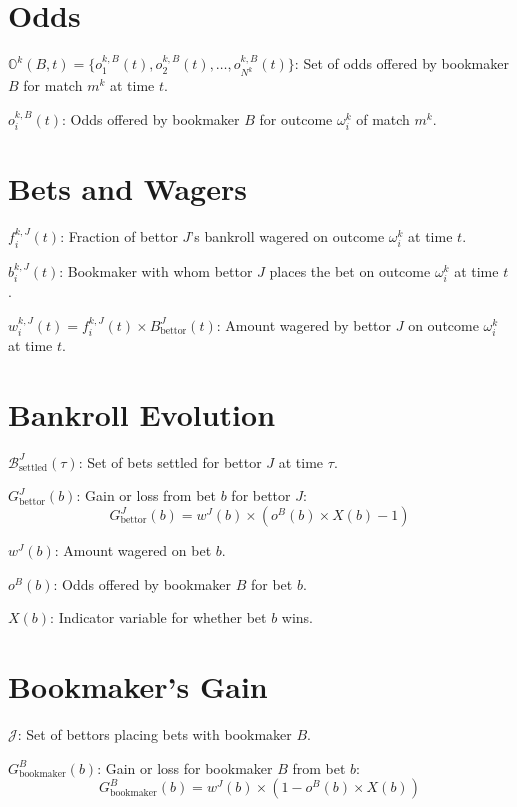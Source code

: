 \section{Odds}

\item \( \mathbb{O}^k(B, t) = \{ o_1^{k,B}(t), o_2^{k,B}(t), \dots, o_{N^k}^{k,B}(t) \} \): Set of odds offered by bookmaker \( B \) for match \( m^k \) at time \( t \).
\item \( o_i^{k,B}(t) \): Odds offered by bookmaker \( B \) for outcome \( \omega_i^k \) of match \( m^k \).

\section{Bets and Wagers}

\item \( f_i^{k,J}(t) \): Fraction of bettor \( J \)'s bankroll wagered on outcome \( \omega_i^k \) at time \( t \).
\item \( b_i^{k,J}(t) \): Bookmaker with whom bettor \( J \) places the bet on outcome \( \omega_i^k \) at time \( t \).
\item \( w_i^{k,J}(t) = f_i^{k,J}(t) \times B_{\text{bettor}}^J(t) \): Amount wagered by bettor \( J \) on outcome \( \omega_i^k \) at time \( t \).

\section{Bankroll Evolution}

\item \( \mathcal{B}_{\text{settled}}^J(\tau) \): Set of bets settled for bettor \( J \) at time \( \tau \).
\item \( G_{\text{bettor}}^J(b) \): Gain or loss from bet \( b \) for bettor \( J \):
  \[
  G_{\text{bettor}}^J(b) = w^{J}(b) \times \left( o^{B}(b) \times X(b) - 1 \right)
  \]
  \item \( w^{J}(b) \): Amount wagered on bet \( b \).
  \item \( o^{B}(b) \): Odds offered by bookmaker \( B \) for bet \( b \).
  \item \( X(b) \): Indicator variable for whether bet \( b \) wins.

\section{Bookmaker's Gain}

\item \( \mathcal{J} \): Set of bettors placing bets with bookmaker \( B \).
\item \( G_{\text{bookmaker}}^B(b) \): Gain or loss for bookmaker \( B \) from bet \( b \):
  \[
  G_{\text{bookmaker}}^B(b) = w^{J}(b) \times \left( 1 - o^{B}(b) \times X(b) \right)
  \]

